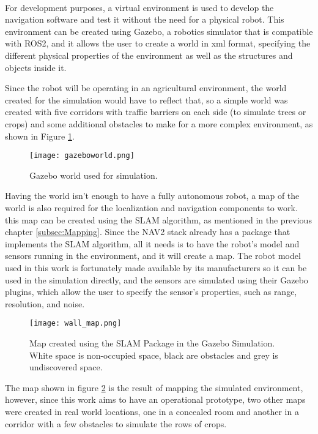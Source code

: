 \paragraph{}For development purposes, a virtual environment is used to develop the navigation software 
and test it without the need for a physical robot. This environment can be created using Gazebo, a 
robotics simulator that is compatible with \gls{ROS2}, and it allows the user to create a world in xml format, specifying 
the different physical properties of the environment as well as the structures and objects inside it.

Since the robot will be operating in an agricultural environment, the world created for 
the simulation would have to reflect that, so a simple world was created with five 
corridors with traffic barriers on each side (to simulate trees or crops) and some additional 
obstacles to make for a more complex environment, as shown in Figure \ref{fig:gazebo_world}.
\begin{figure}[H]
    \centering
    \texttt{[image: gazeboworld.png]}
    \caption{Gazebo world used for simulation.}
    \label{fig:gazebo_world}
\end{figure}

Having the world isn't enough to have a fully autonomous robot, a map 
of the world is also required for the localization and navigation components to work. 
this map can be created using the \gls{SLAM} algorithm, as mentioned in the previous chapter \ref{subsec:Mapping}. 
Since the \gls{NAV2} stack already has a package that implements the \gls{SLAM} algorithm, all it needs is to 
have the robot's model and sensors running in the environment, and it will create a map.
The robot model used in this work is fortunately made available by its manufacturers 
so it can be used in the simulation directly, and the sensors are simulated using their 
Gazebo plugins, which allow the user to specify the sensor's properties, such as range, resolution, and noise.
\begin{figure}[H]
    \centering
    \texttt{[image: wall\_map.png]}
    \caption{Map created using the SLAM Package in the Gazebo Simulation. White space is non-occupied space, black are obstacles and grey is undiscovered space.}
    \label{fig:slam_map}
\end{figure}
\clearpage

The map shown in figure \ref{fig:slam_map} is the result of mapping the simulated environment, 
however, since this work aims to have an operational prototype, two other maps were created 
in real world locations, one in a concealed room and another in a corridor with a few obstacles to simulate the rows 
of crops. 

